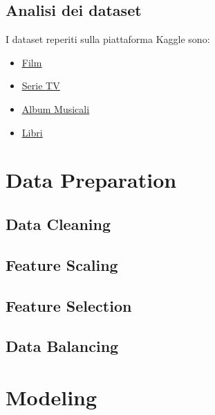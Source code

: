 \documentclass[a4paper, 12pt]{report}
\begin{document}
        \section{Analisi dei dataset}\label{sec:analisi-dei-dataset}
            I dataset reperiti sulla piattaforma Kaggle sono:
            \begin{itemize}
                \item \href{https://www.kaggle.com/datasets/stefanoleone992/filmtv-movies-dataset?resource=download}{\underline{Film}}
                \item \href{https://www.kaggle.com/datasets/amritvirsinghx/web-series-ultimate-edition}{\underline{Serie TV}}
                \item \href{https://www.kaggle.com/datasets/lucascantu/top-5000-albums-of-all-time-spotify-features}{\underline{Album Musicali}}
                \item \href{https://www.kaggle.com/datasets/mdhamani/goodreads-books-100k}{\underline{Libri}}
            \end{itemize}


    \chapter{Data Preparation}\label{ch:data-preparation}


        \section{Data Cleaning}\label{sec:data-cleaning}


        \section{Feature Scaling}\label{sec:feature-scaling}


        \section{Feature Selection}\label{sec:feature-selection}


        \section{Data Balancing}\label{sec:data-balancing}


    \chapter{Modeling}\label{ch:modeling}
\end{document}
